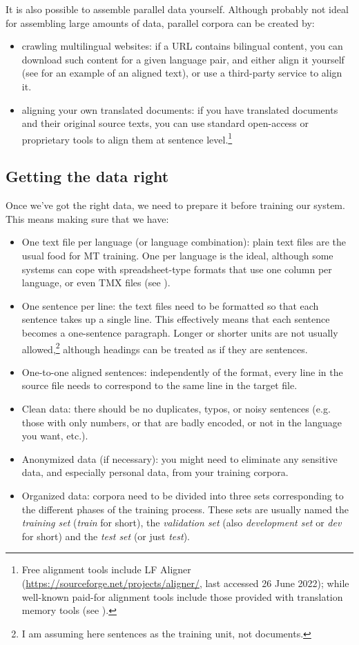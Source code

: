 \documentclass[output=paper]{langscibook}
\begin{document}
It is also possible to assemble parallel data yourself. Although probably not ideal for assembling large amounts of data, parallel corpora can be created by:
\begin{itemize}
\item crawling multilingual websites: if a URL contains bilingual content, you can download such content for a given language pair, and either align it yourself (see  for an example of an aligned text), or use a third-party service to align it.
\item aligning your own translated documents: if you have translated documents and their original source texts, you can use standard open-access or proprietary tools to align them at sentence level.\footnote{Free alignment tools include LF Aligner (\url{https://sourceforge.net/projects/aligner/}, last accessed 26 June 2022); while well-known paid-for alignment tools include those provided with translation memory tools (see ).}
\end{itemize}

\subsection{Getting the data right}

Once we've got the right data, we need to prepare it before training our system. This means making sure that we have:  
\begin{itemize}
\item One text file per language (or language combination): plain text files are the usual food for MT training. One per language is the ideal, although some systems can cope with spreadsheet-type formats that use one column per language, or even TMX files (see ).
\item One sentence per line: the text files need to be formatted so that each sentence takes up a single line. This effectively means that each sentence becomes a one-sentence paragraph. Longer or shorter units are not usually allowed,\footnote{I am assuming here sentences as the training unit, not documents.} although headings can be treated as if they are sentences.
\item One-to-one aligned sentences: independently of the format, every line in the source file needs to correspond to the same line in the target file. 
\item Clean data: there should be no duplicates, typos, or noisy sentences (e.g. those with only numbers, or that are badly encoded, or not in the language you want, etc.).
\item Anonymized data (if necessary): you might need to eliminate any sensitive data, and especially personal data, from your training corpora.
\item Organized data: corpora need to be divided into three sets corresponding to the different phases of the training process. These sets are usually named the \textit{training set} (\textit{train} for short), the \textit{validation set} (also \textit{development set} or \textit{dev} for short) and the \textit{test set} (or just \textit{test}).

\end{itemize}
\end{document}

